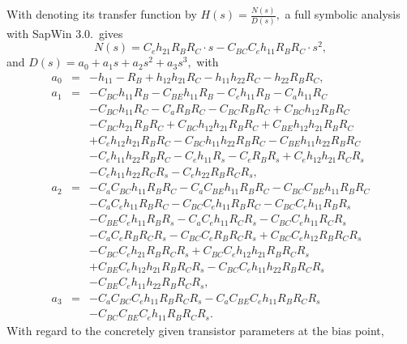 \documentclass[10pt,twocolumn,pagenumbers]{IEEEtran}
\begin{document}
With denoting its transfer function by $H(s) = \frac{N(s)}{D(s)},$  a full symbolic analysis with SapWin 3.0.\ gives
\begin{equation}
N(s)
=
C_e h_{21} R_B R_C \cdot s - C_{BC} C_e h_{11} R_B R_C\cdot s^2,
\nonumber
\end{equation}
and
$
D(s)= a_0 + a_1 s + a_2 s^2 + a_3 s^3,
$
with
\begin{eqnarray*}
a_0 & = &
\scriptstyle
 -h_{11} - R_B + h_{12} h_{21} R_C - h_{11} h_{22} R_C - 
 h_{22} R_B R_C,\\
a_1 
& = &
\scriptstyle
  - C_{BC} h_{11} R_B - C_{BE} h_{11} R_B - C_e h_{11} R_B - C_a h_{11} R_C\\
&&\scriptstyle
 - C_{BC} h_{11} R_C - C_a R_B R_C - C_{BC} R_B R_C + C_{BC} h_{12} R_B R_C\\ 
&&\scriptstyle
 - C_{BC} h_{21} R_B R_C + C_{BC} h_{12} h_{21} R_B R_C + C_{BE} h_{12} h_{21} R_B R_C\\
&&\scriptstyle
 + C_e h_{12} h_{21} R_B R_C - C_{BC} h_{11} h_{22} R_B R_C - C_{BE} h_{11} h_{22} R_B R_C\\
&&\scriptstyle
 - C_e h_{11} h_{22} R_B R_C - C_e h_{11} R_s - C_e R_B R_s + C_e h_{12} h_{21} R_C R_s\\
&&\scriptstyle
 - C_e h_{11} h_{22} R_C R_s - C_e h_{22} R_B R_C R_s,\\
a_2 & = &
\scriptstyle
-C_a C_{BC} h_{11} R_B R_C - C_a C_{BE} h_{11} R_B R_C - C_{BC} C_{BE} h_{11} R_B R_C\\
&&\scriptstyle
- C_a C_e h_{11} R_B R_C - C_{BC} C_e h_{11} R_B R_C - C_{BC} C_e h_{11} R_B R_s\\
&&\scriptstyle
 - C_{BE} C_e h_{11} R_B R_s - C_a C_e h_{11} R_C R_s - C_{BC} C_e h_{11} R_C R_s\\
&&\scriptstyle
 - C_a C_e R_B R_C R_s - C_{BC} C_e R_B R_C R_s + C_{BC} C_e h_{12} R_B R_C R_s\\
&&\scriptstyle
 - C_{BC} C_e h_{21} R_B R_C R_s + C_{BC} C_e h_{12} h_{21} R_B R_C R_s\\
&&\scriptstyle
 + C_{BE} C_e h_{12} h_{21} R_B R_C R_s - C_{BC} C_e h_{11} h_{22} R_B R_C R_s\\
&&\scriptstyle
 - C_{BE} C_e h_{11} h_{22} R_B R_C R_s,\\
a_3 &=&
\scriptstyle
-C_a C_{BC} C_e h_{11} R_B R_C R_s - C_a C_{BE} C_e h_{11} R_B R_C R_s\\
&&\scriptstyle
 - C_{BC} C_{BE} C_e h_{11} R_B R_C R_s.
\end{eqnarray*}
\noindent
With regard to the concretely given transistor parameters at the bias point,
\end{document}
